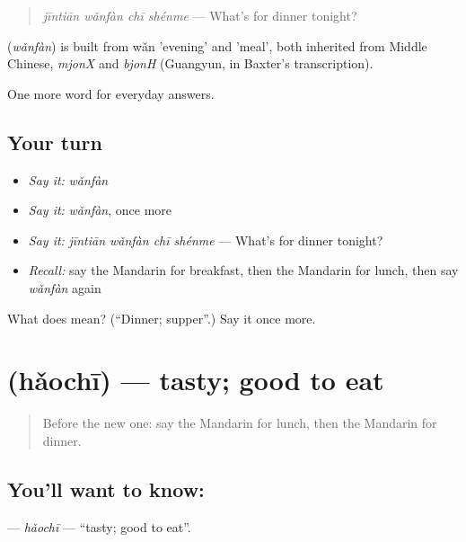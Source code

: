 \begin{quote}
\textbf{} \emph{jīntiān wǎnfàn chī shénme} — What's for dinner tonight?
\end{quote}

\begin{cousinweb}
\textbf{} (\emph{wǎnfàn}) is built from wǎn 'evening' and  'meal', both inherited from Middle Chinese, \emph{mjonX} and \emph{bjonH} (Guangyun, in Baxter's transcription).
\end{cousinweb}

\begin{grammarlens}[title={What you've built}]
One more word for everyday answers.
\end{grammarlens}

\subsection*{Your turn}
\begin{itemize}
\raggedright
  \item \emph{Say it:} \emph{wǎnfàn}
  \item \emph{Say it:} \emph{wǎnfàn}, once more
  \item \emph{Say it:} \emph{jīntiān wǎnfàn chī shénme} — What's for dinner tonight?
  \item \emph{Recall:} say the Mandarin for breakfast, then the Mandarin for lunch, then say \emph{wǎnfàn} again
\end{itemize}

\begin{tcolorbox}[breakable,colback=teal!4,colframe=teal!35!black,title={Before you move on}]
What does  mean? (\textquotedblleft{}Dinner; supper\textquotedblright{}.) Say it once more.
\end{tcolorbox}
\section[\texorpdfstring{\zh{好吃} (hǎochī)}{好吃 (hǎochī)}]{ (hǎochī) — tasty; good to eat}

\label{lesson:ZH-C69-haochi}



\begin{quote}
Before the new one: say the Mandarin for lunch, then the Mandarin for dinner.
\end{quote}

\subsection*{You'll want to know: }
\textbf{} — \emph{hǎochī} — \textquotedblleft{}tasty; good to eat\textquotedblright{}.

